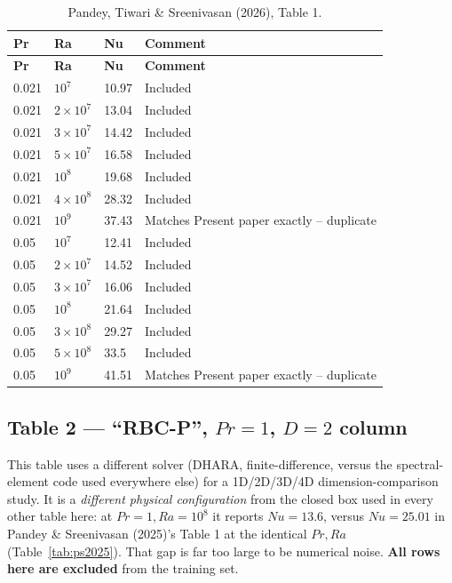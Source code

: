 \documentclass[11pt]{article}
\begin{document}
\begin{longtable}{l l l l}
\caption{Pandey, Tiwari \& Sreenivasan (2026), Table 1.}\label{tab:pandey2026t1}\\
\toprule
\textbf{Pr} & \textbf{Ra} & \textbf{Nu} & \textbf{Comment} \\
\midrule
\endfirsthead
\toprule
\textbf{Pr} & \textbf{Ra} & \textbf{Nu} & \textbf{Comment} \\
\midrule
\endhead
\bottomrule
\endfoot
\rowcolor{included} 0.021 & $10^{7}$ & 10.97 & Included \\
\rowcolor{included} 0.021 & $2\times10^{7}$ & 13.04 & Included \\
\rowcolor{included} 0.021 & $3\times10^{7}$ & 14.42 & Included \\
\rowcolor{included} 0.021 & $5\times10^{7}$ & 16.58 & Included \\
\rowcolor{included} 0.021 & $10^{8}$ & 19.68 & Included \\
\rowcolor{included} 0.021 & $4\times10^{8}$ & 28.32 & Included \\
\rowcolor{excluded} 0.021 & $10^{9}$ & 37.43 & Matches Present paper exactly -- duplicate \\
\rowcolor{included} 0.05 & $10^{7}$ & 12.41 & Included \\
\rowcolor{included} 0.05 & $2\times10^{7}$ & 14.52 & Included \\
\rowcolor{included} 0.05 & $3\times10^{7}$ & 16.06 & Included \\
\rowcolor{included} 0.05 & $10^{8}$ & 21.64 & Included \\
\rowcolor{included} 0.05 & $3\times10^{8}$ & 29.27 & Included \\
\rowcolor{included} 0.05 & $5\times10^{8}$ & 33.5 & Included \\
\rowcolor{excluded} 0.05 & $10^{9}$ & 41.51 & Matches Present paper exactly -- duplicate \\
\end{longtable}
\subsection*{Table 2 --- ``RBC-P'', $Pr=1$, $D=2$ column}
This table uses a different solver (DHARA, finite-difference, versus
the spectral-element code used everywhere else) for a 1D/2D/3D/4D
dimension-comparison study. It is a \emph{different physical configuration}
from the closed box used in every other table here: at $Pr=1, Ra=10^8$ it
reports $Nu=13.6$, versus $Nu=25.01$ in Pandey \& Sreenivasan (2025)'s Table
1 at the identical $Pr, Ra$ (Table~\ref{tab:ps2025}). That gap is far too
large to be numerical noise. \textbf{All rows here are excluded} from the
training set.
\end{document}
